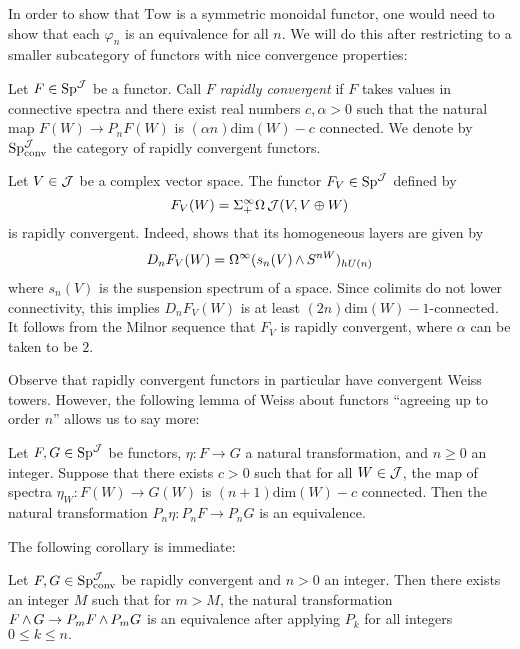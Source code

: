 In order to show that $\text{Tow}$ is a symmetric monoidal functor, one would need to show that each $\varphi_n$ is an equivalence for all $n$.  We will do this after restricting to a smaller subcategory of functors with nice convergence properties:

\begin{dfn}
Let $F\in \operatorname{\mathrm{Sp}}^{\operatorname{\mathcal{J}}}$ be a functor.  Call $F$ \emph{rapidly convergent} if $F$ takes values in connective spectra and there exist real numbers $c,\alpha>0$ such that the natural map $F(W) \to P_nF(W)$ is $(\alpha n)\text{dim}(W) - c$ connected.  We denote by $\operatorname{\mathrm{Sp}}^{\operatorname{\mathcal{J}}}_{\text{conv}}$ the category of rapidly convergent functors.  
\end{dfn}

\begin{exm} \label{ex:aronefunctor}
Let $V\in \operatorname{\mathcal{J}}$ be a complex vector space.  
The functor $F_V\in \operatorname{\mathrm{Sp}}^{\operatorname{\mathcal{J}}}$ defined by $$F_V(W) = \Sigma^{\infty}_+ \Omega \operatorname{\mathcal{J}}(V, V\oplus W)$$ is rapidly convergent.  Indeed, \cite{Arone} shows that its homogeneous layers are given by $$D_nF_V(W) = \Omega^{\infty}(s_n(V) \operatorname{\wedge} S^{nW})_{hU(n)}$$ where $s_n(V)$ is the suspension spectrum of a space.  Since colimits do not lower connectivity, this implies $D_nF_V(W)$ is at least $(2n)\text{dim}(W)-1$-connected.  It follows from the Milnor sequence that $F_V$ is rapidly convergent, where $\alpha$ can be taken to be $2$.  
\end{exm}

Observe that rapidly convergent functors in particular have convergent Weiss towers.  However, the following lemma of Weiss about functors ``agreeing up to order $n$'' allows us to say more:

\begin{lem}\label{lem:ordernagree}
Let $F,G\in \operatorname{\mathrm{Sp}}^{\operatorname{\mathcal{J}}}$ be functors, $\eta: F\to G$ a natural transformation, and $n\geq 0$ an integer.  Suppose that there exists $c>0$ such that for all $W\in \operatorname{\mathcal{J}}$, the map of spectra $\eta_W: F(W) \to G(W)$ is $(n+1)\text{dim}(W) -c$ connected.  Then the natural transformation $P_n\eta: P_n F\to P_n G$ is an equivalence.  
\end{lem}

The following corollary is immediate:

\begin{cor} \label{cor:rapidconv}
Let $F,G\in \operatorname{\mathrm{Sp}}^{\operatorname{\mathcal{J}}}_{\text{conv}}$ be rapidly convergent and $n>0$ an integer.  Then there exists an integer $M$ such that for $m>M$, the natural transformation $F\operatorname{\wedge} G \to P_m F\operatorname{\wedge} P_m G$ is an equivalence after applying $P_k$ for all integers $0\leq k \leq n.$  
\end{cor}

